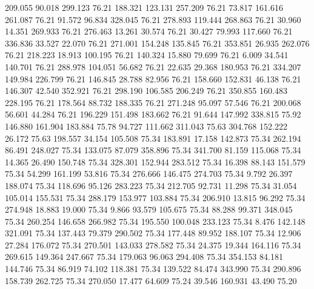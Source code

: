  209.055   90.018  299.123        76.21
 188.321  123.131  257.209        76.21
  73.817  161.616  261.087        76.21
  91.572   96.834  328.045        76.21
 278.893  119.444  268.863        76.21
  30.960   14.351  269.933        76.21
 276.463   13.261   30.574        76.21
  30.427   79.993  117.660        76.21
 336.836   33.527   22.070        76.21
 271.001  154.248  135.845        76.21
 353.851   26.935  262.076        76.21
 218.223   18.913  100.195        76.21
 140.324   15.880   79.699        76.21
   6.009   34.541  140.701        76.21
 288.978  104.051   56.682        76.21
  22.635   29.368  180.953        76.21
 334.207  149.984  226.799        76.21
 146.845   28.788   82.956        76.21
 158.660  152.831   46.138        76.21
 146.307   42.540  352.921        76.21
 298.190  106.585  206.249        76.21
 350.855  160.483  228.195        76.21
 178.564   88.732  188.335        76.21
 271.248   95.097   57.546        76.21
 200.068   56.601   44.284        76.21
 196.229  151.498  183.662        76.21
  91.644  147.992  338.815        75.92
 146.880  161.904  183.884        75.78
  94.727  111.662  311.043        75.63
 304.768  152.222   26.172        75.63
 198.557   34.154  105.508        75.34
 183.891   17.158  142.873        75.34
 262.194   86.491  248.027        75.34
 133.075   87.079  358.896        75.34
 341.700   81.159  115.068        75.34
  14.365   26.490  150.748        75.34
 328.301  152.944  283.512        75.34
  16.398   88.143  151.579        75.34
  54.299  161.199   53.816        75.34
 276.666  146.475  274.703        75.34
   9.792   26.397  188.074        75.34
 118.696   95.126  283.223        75.34
 212.705   92.731   11.298        75.34
  31.054  105.014  155.531        75.34
 288.179  153.977  103.884        75.34
 206.910   13.815   96.292        75.34
 274.948   18.883   19.000        75.34
   9.866   93.579  105.675        75.34
  88.288   99.371  348.045        75.34
 260.254  146.658  266.982        75.34
 195.550  100.048  233.123        75.34
   8.476  142.148  321.091        75.34
 137.443   79.379  290.502        75.34
 177.448   89.952  188.107        75.34
  12.906   27.284  176.072        75.34
 270.501  143.033  278.582        75.34
  24.375   19.344  164.116        75.34
 269.615  149.364  247.667        75.34
 179.063   96.063  294.408        75.34
 354.153   84.181  144.746        75.34
  86.919   74.102  118.381        75.34
 139.522   84.474  343.990        75.34
 290.896  158.739  262.725        75.34
 270.050   17.477   64.609        75.24
  39.546  160.931   43.490        75.20

